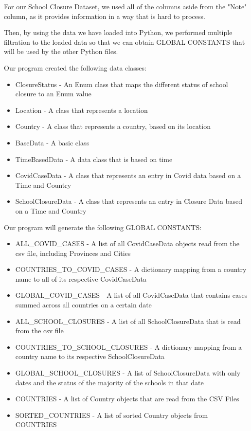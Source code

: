 \documentclass[fontsize=11pt]{article}
\begin{document}
    For our School Closure Dataset, we used all of the columns aside from the "Note" column, as it provides information in a way that is hard to process.

    Then, by using the data we have loaded into Python, we performed multiple filtration to the loaded data so that we can obtain GLOBAL CONSTANTS that will be used by the other Python files.

    Our program created the following data classes:

    \begin{itemize}
        \item ClosureStatus - An Enum class that maps the different status of school closure to an Enum value
        \item Location - A class that represents a location
        \item Country - A class that represents a country, based on its location
        \item BaseData - A basic class
        \item TimeBasedData - A data class that is based on time
        \item CovidCaseData - A class that represents an entry in Covid data based on a Time and Country
        \item SchoolClosureData - A class that represents an entry in Closure Data based on a Time and Country
    \end{itemize}

    Our program will generate the following GLOBAL CONSTANTS:

    \begin{itemize}
        \item ALL\_COVID\_CASES - A list of all CovidCaseData objects read from the csv file, including Provinces and Cities
        \item COUNTRIES\_TO\_COVID\_CASES - A dictionary mapping from a country name to all of its respective CovidCaseData
        \item GLOBAL\_COVID\_CASES - A list of all CovidCaseData that contains cases summed across all countries on a certain date
        \item ALL\_SCHOOL\_CLOSURES - A list of all SchoolClosureData that is read from the csv file
        \item COUNTRIES\_TO\_SCHOOL\_CLOSURES - A dictionary mapping from a country name to its respective SchoolClosureData
        \item GLOBAL\_SCHOOL\_CLOSURES - A list of SchoolClosureData with only dates and the status of the majority of the schools in that date
        \item COUNTRIES - A list of Country objects that are read from the CSV Files
        \item SORTED\_COUNTRIES - A list of sorted Country objects from COUNTRIES
    \end{itemize}
\end{document}
